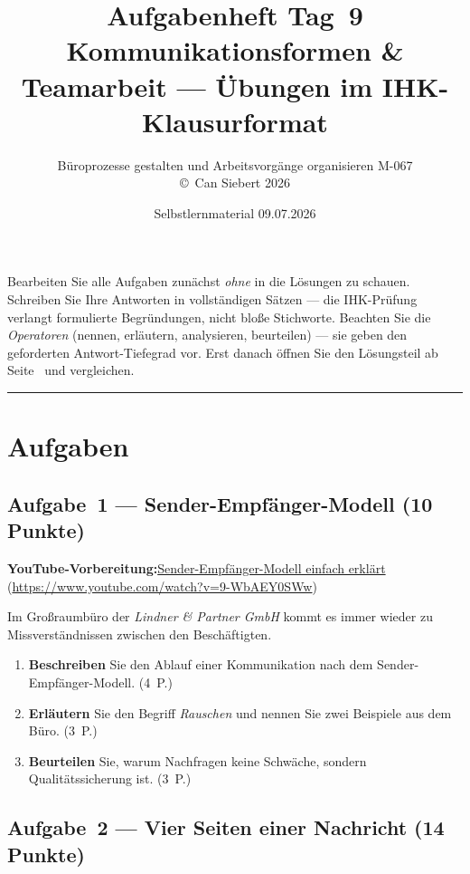 \documentclass[11pt, a4paper]{article}
\title{\vspace*{-1.5cm}\Huge\bfseries\color{bfwPrimaryDark}Aufgabenheft Tag~9\\[0.4em]
  \large\color{bfwInkSoft}\textnormal{Kommunikationsformen \& Teamarbeit --- Übungen im IHK-Klausurformat}}
\author{\textsf{Büroprozesse gestalten und Arbeitsvorgänge organisieren \textperiodcentered{} M-067}\\
\textsf{\small\copyright\ Can Siebert\,\textperiodcentered\,2026}}
\date{Selbstlernmaterial \textperiodcentered{} 09.07.2026}
\begin{document}
\maketitle
\thispagestyle{empty}

\begin{merksatz}[title={\bfseries So nutzen Sie dieses Aufgabenheft}]
Bearbeiten Sie alle Aufgaben zunächst \emph{ohne} in die Lösungen zu schauen. Schreiben
Sie Ihre Antworten in vollständigen Sätzen --- die IHK-Prüfung verlangt formulierte
Begründungen, nicht bloße Stichworte. Beachten Sie die \emph{Operatoren} (nennen,
erläutern, analysieren, beurteilen) --- sie geben den geforderten Antwort-Tiefegrad vor.
Erst danach öffnen Sie den Lösungsteil ab Seite~\pageref{loesungen} und vergleichen.
\end{merksatz}

\tableofcontents
\vspace{1em}
\hrule

\section{Aufgaben}

\subsection*{Aufgabe~1 --- Sender-Empfänger-Modell (10 Punkte)}

\noindent\textbf{\color{bfwAccent}YouTube-Vorbereitung:}\enspace \href{https://www.youtube.com/watch?v=9-WbAEY0SWw}{Sender-Empfänger-Modell einfach erklärt} (\url{https://www.youtube.com/watch?v=9-WbAEY0SWw})

\medskip
Im Großraumbüro der \emph{Lindner \& Partner GmbH} kommt es immer wieder zu
Missverständnissen zwischen den Beschäftigten.

\begin{enumerate}[label=(\alph*)]
  \item \textbf{Beschreiben} Sie den Ablauf einer Kommunikation nach dem Sender-Empfänger-Modell. \hfill (4~P.)
  \item \textbf{Erläutern} Sie den Begriff \emph{Rauschen} und nennen Sie zwei Beispiele aus dem Büro. \hfill (3~P.)
  \item \textbf{Beurteilen} Sie, warum Nachfragen keine Schwäche, sondern Qualitätssicherung ist. \hfill (3~P.)
\end{enumerate}

\subsection*{Aufgabe~2 --- Vier Seiten einer Nachricht (14 Punkte)}
\end{document}
